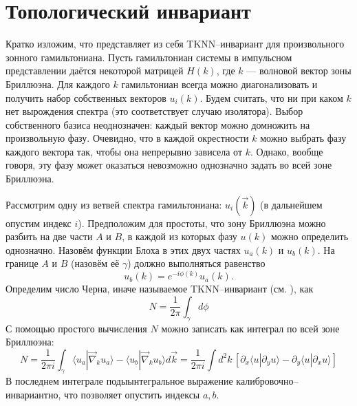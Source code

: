 \section{Топологический инвариант}
Кратко изложим, что представляет из себя TKNN--инвариант для произвольного 
зонного гамильтониана. Пусть гамильтониан системы в импульсном представлении даётся некоторой
матрицей $H(k)$, где $k$ --- волновой вектор зоны Бриллюэна.  
Для каждого $k$ гамильтониан всегда можно диагонализовать
и получить набор собственных векторов $u_i(k)$. Будем считать, что ни при каком $k$ нет 
вырождения спектра (это соответствует случаю изолятора). 
Выбор собственного базиса неоднозначен: каждый вектор
можно домножить на произвольную фазу. Очевидно, что в каждой окрестности $k$ можно выбрать
фазу каждого вектора так, чтобы она непрерывно зависела от $k$. Однако, вообще говоря, 
эту фазу может оказаться невозможно однозначно задать во всей зоне Бриллюэна.

Рассмотрим одну из ветвей спектра гамильтониана: $u_i(\vec{k})$ 
(в дальнейшем опустим индекс $i$). Предположим для простоты, что зону Бриллюэна
можно разбить на две части $A$ и $B$, 
в каждой из которых фазу $u(k)$  можно определить однозначно. 
Назовём функции Блоха в этих двух частях $u_a(k)$ и $u_b(k)$. На границе $A$ и $B$ (назовём
её $\gamma$) должно выполняться равенство
\begin{equation}
   u_b(k) = e^{-i\phi(k)}u_a(k).
\end{equation}
Определим число Черна, иначе называемое $\mathrm{TKNN}$--инвариант 
(см. \cite{Kohmoto1985, Thouless1982}), как
\begin{equation}
    \label{chern_number_definition}
    N = \frac{1}{2\pi}\int_\gamma d\phi
\end{equation}
С помощью простого вычисления %
$N$ можно записать как интеграл по всей зоне Бриллюэна:
\begin{equation}
    N = \frac{1}{2\pi i}\int_\gamma \langle u_a |\vec{\nabla}_k u_a \rangle  - 
                             \langle u_b |\vec{\nabla}_k u_b \rangle d\vec{k} = 
        \frac{1}{2\pi i} 
            \int d^2 k\, \left[\partial_x \langle u | \partial_y u \rangle -
            \partial_y \langle u | \partial_x u \rangle \right]
\end{equation}
В последнем интеграле подыынтегральное выражение калибровочно--инвариантно, что
позволяет опустить индексы $a,b$. 

